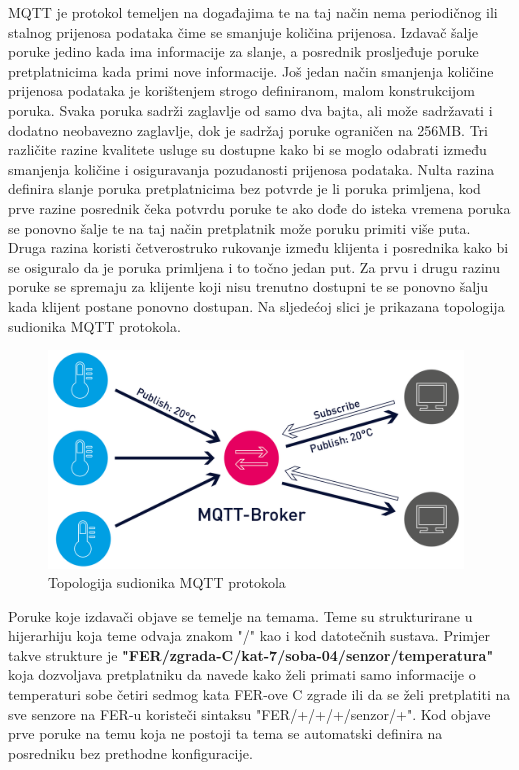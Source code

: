 \documentclass[times, utf8, diplomski]{fer}
\begin{document}
MQTT je protokol temeljen na događajima te na taj način nema periodičnog ili stalnog prijenosa podataka čime se smanjuje količina prijenosa. Izdavač šalje poruke jedino kada ima informacije za slanje, a posrednik prosljeđuje poruke pretplatnicima kada primi nove informacije. Još jedan način smanjenja količine prijenosa podataka je korištenjem strogo definiranom, malom konstrukcijom poruka. Svaka poruka sadrži zaglavlje od samo dva bajta, ali može sadržavati i dodatno neobavezno zaglavlje, dok je sadržaj poruke ograničen na 256MB. Tri različite razine kvalitete usluge su dostupne kako bi se moglo odabrati između smanjenja količine i osiguravanja pozudanosti prijenosa podataka. Nulta razina definira slanje poruka pretplatnicima bez potvrde je li poruka primljena, kod prve razine posrednik čeka potvrdu poruke te ako dođe do isteka vremena poruka se ponovno šalje te na taj način pretplatnik može poruku primiti više puta. Druga razina koristi četverostruko rukovanje između klijenta i posrednika kako bi se osiguralo da je poruka primljena i to točno jedan put. Za prvu i drugu razinu poruke se spremaju za klijente koji nisu trenutno dostupni te se ponovno šalju kada klijent postane ponovno dostupan. Na sljedećoj slici je prikazana topologija sudionika MQTT protokola.
\begin{figure}[htb]
    \centering
    \includegraphics[width=11cm]{images/mqtt.png}
    \caption{Topologija sudionika MQTT protokola\citep{MQTT}}
    \label{fig:mqtt}
\end{figure}

Poruke koje izdavači objave se temelje na temama. Teme su strukturirane u hijerarhiju koja teme odvaja znakom "/" kao i kod datotečnih sustava. Primjer takve strukture je \textbf{"FER/zgrada-C/kat-7/soba-04/senzor/temperatura"} koja dozvoljava pretplatniku da navede kako želi primati samo informacije o temperaturi sobe četiri sedmog kata FER-ove C zgrade ili da se želi pretplatiti na sve senzore na FER-u koristeči sintaksu "FER/+/+/+/senzor/+". Kod objave prve poruke na temu koja ne postoji ta tema se automatski definira na posredniku bez prethodne konfiguracije.
\end{document}
